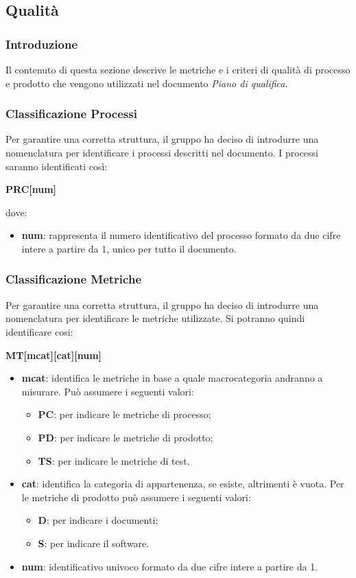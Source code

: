 \subsection{Qualità} \label{qualita}

\subsubsection{Introduzione}
Il contenuto di questa sezione descrive le metriche e i criteri di qualità di processo e prodotto che vengono utilizzati nel documento \textit{Piano di qualifica}.

\subsubsection{Classificazione Processi}
Per garantire una corretta struttura, il gruppo ha deciso di introdurre una nomenclatura per identificare i processi descritti nel documento. I processi saranno identificati così:
\begin{center}
	\textbf{PRC[num]}
\end{center}
dove:
\begin{itemize}
	\item \textbf{num}: rappresenta il numero identificativo del processo formato da due cifre intere a partire da 1, unico per tutto il documento.
\end{itemize}

\subsubsection{Classificazione Metriche}
Per garantire una corretta struttura, il gruppo ha deciso di introdurre una nomenclatura per identificare le metriche utilizzate. Si potranno quindi identificare cosi:
\begin{center}
	\textbf{MT[mcat][cat][num]}
\end{center}
\begin{itemize}
		\item \textbf{mcat}: identifica le metriche in base a quale macrocategoria andranno a misurare. Può assumere i seguenti valori:
	\begin{itemize}
		\item \textbf{PC}: per indicare le metriche di processo;
		\item \textbf{PD}: per indicare le metriche di prodotto;
		\item \textbf{TS}: per indicare le metriche di test.
	\end{itemize}
	\item \textbf{cat}: identifica la categoria di appartenenza, se esiste, altrimenti è vuota. Per le metriche di prodotto può assumere i seguenti valori:
	\begin{itemize}
		\item \textbf{D}: per indicare i documenti;
		\item \textbf{S}: per indicare il software.
	\end{itemize}

	\item \textbf{num}: identificativo univoco formato da due cifre intere a partire da 1.
\end{itemize}

